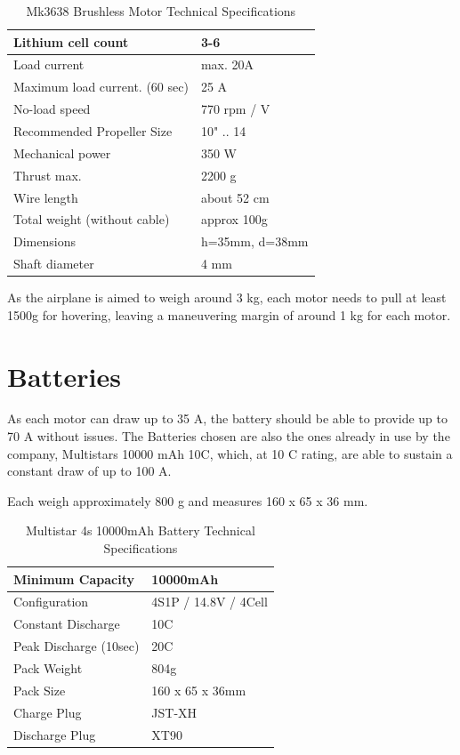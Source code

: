 \begin{table}[H]
\centering
\caption{Mk3638 Brushless Motor Technical Specifications}
\label{tab:mk3638}
\begin{tabular}{|l|l|}
\hline
Lithium cell count 					& 3-6 \\ \hline
Load current      					& max. 20A \\ \hline
Maximum load current. (60 sec)		& 25 A \\ \hline
No-load speed 						& 770 rpm / V \\ \hline
Recommended Propeller Size 			& 10" .. 14 \\ \hline
Mechanical power					& 350 W \\ \hline
Thrust max.							& 2200 g \\ \hline
Wire length							& about 52 cm \\ \hline
Total weight (without cable)		& approx 100g \\ \hline
Dimensions							& h=35mm, d=38mm \\ \hline
Shaft diameter						& 4 mm \\ \hline
\end{tabular}
\end{table}

As the airplane is aimed to weigh around 3 kg, each motor needs to pull at least 1500g for hovering, leaving a maneuvering margin of around 1 kg for each motor.

\section{Batteries}

As each motor can draw up to 35 A, the battery should be able to provide up to 70 A without issues.
The Batteries chosen are also the ones already in use by the company, Multistars 10000 mAh 10C, which, at 10 C rating, are able to sustain a constant draw of up to 100 A. 

Each weigh approximately 800 g and measures 160 x 65 x 36 mm.



\begin{table}[h]
\centering
\caption{Multistar 4s 10000mAh Battery Technical Specifications}
\label{tab:multistar}
\begin{tabular}{|l|l|}
\hline
Minimum Capacity		& 10000mAh \\ \hline
Configuration			& 4S1P / 14.8V / 4Cell \\ \hline
Constant Discharge		& 10C \\ \hline
Peak Discharge (10sec)	& 20C \\ \hline
Pack Weight				& 804g \\ \hline
Pack Size				& 160 x 65 x 36mm \\ \hline
Charge Plug				& JST-XH \\ \hline
Discharge Plug			& XT90 \\ \hline
\end{tabular}
\end{table}

